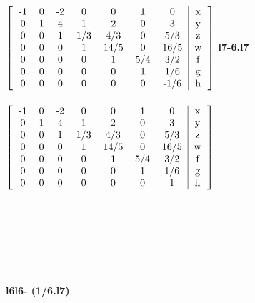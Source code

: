 \documentclass{article}
\begin{document}
\begin{hbox}{

$\left[
\begin{tabular}{ccccccc|c}
-1 & 0 & -2 & 0 & 0 & 1 & 0 & x\\
0 & 1 & 4 & 1 & 2 & 0 & 3 & y\\
0 & 0 & 1 & 1/3 & 4/3 & 0 & 5/3 & z\\
0 & 0 & 0 & 1 & 14/5 & 0 & 16/5 & w\\
0 & 0 & 0 & 0 & 1 & 5/4 & 3/2 & f\\
0 & 0 & 0 & 0 & 0 & 1 & 1/6 & g\\
0 & 0 & 0 & 0 & 0 & 0 & -1/6 & h\\
\end{tabular}
\right]

$
\textbf{l7\rightarrow -6.l7}
\\\\
$\left[
\begin{tabular}{ccccccc|c}
-1 & 0 & -2 & 0 & 0 & 1 & 0 & x\\
0 & 1 & 4 & 1 & 2 & 0 & 3 & y\\
0 & 0 & 1 & 1/3 & 4/3 & 0 & 5/3 & z\\
0 & 0 & 0 & 1 & 14/5 & 0 & 16/5 & w\\
0 & 0 & 0 & 0 & 1 & 5/4 & 3/2 & f\\
0 & 0 & 0 & 0 & 0 & 1 & 1/6 & g\\
0 & 0 & 0 & 0 & 0 & 0 & 1 & h\\
\end{tabular}
\right]\\
$}
\end{hbox}\\
\\\\\\\\\\
\textbf{l6\rightarrow l6- (1/6.l7)}
\end{document}
